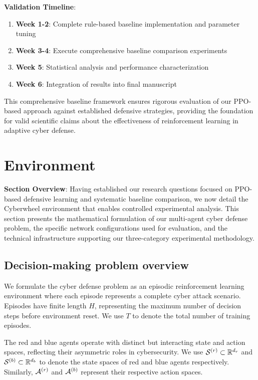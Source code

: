 \documentclass[12pt]{article}
\theoremstyle{definition}
\theoremstyle{plain}
\begin{document}
\textbf{Validation Timeline}:
\begin{enumerate}
    \item \textbf{Week 1-2}: Complete rule-based baseline implementation and parameter tuning
    \item \textbf{Week 3-4}: Execute comprehensive baseline comparison experiments
    \item \textbf{Week 5}: Statistical analysis and performance characterization
    \item \textbf{Week 6}: Integration of results into final manuscript
\end{enumerate}

This comprehensive baseline framework ensures rigorous evaluation of our PPO-based approach against established defensive strategies, providing the foundation for valid scientific claims about the effectiveness of reinforcement learning in adaptive cyber defense.

\section{Environment}

\textbf{Section Overview}: Having established our research questions focused on PPO-based defensive learning and systematic baseline comparison, we now detail the Cyberwheel environment that enables controlled experimental analysis. This section presents the mathematical formulation of our multi-agent cyber defense problem, the specific network configurations used for evaluation, and the technical infrastructure supporting our three-category experimental methodology.

\subsection{Decision-making problem overview}

We formulate the cyber defense problem as an episodic reinforcement learning environment where each episode represents a complete cyber attack scenario. Episodes have finite length $H$, representing the maximum number of decision steps before environment reset. We use $T$ to denote the total number of training episodes.

The red and blue agents operate with distinct but interacting state and action spaces, reflecting their asymmetric roles in cybersecurity. We use $\mathcal{S}^{(r)} \subset \mathbb{R}^{d_r}$ and $\mathcal{S}^{(b)} \subset \mathbb{R}^{d_b}$ to denote the state spaces of red and blue agents respectively. Similarly, $\mathcal{A}^{(r)}$ and $\mathcal{A}^{(b)}$ represent their respective action spaces.
\end{document}
